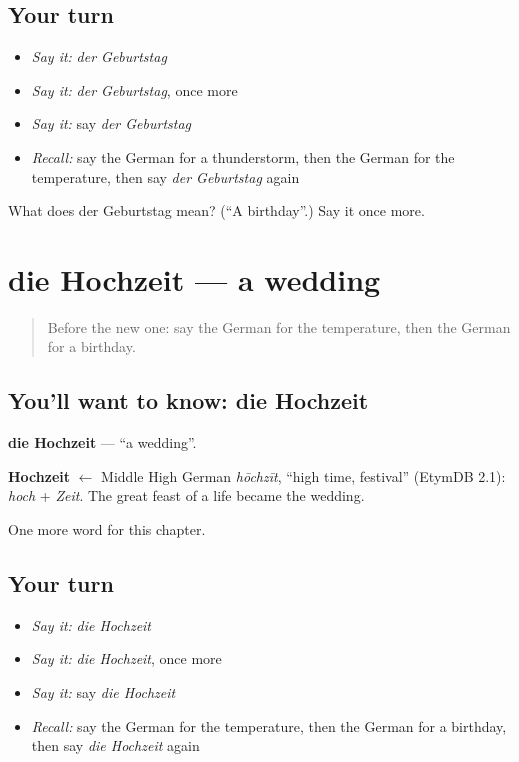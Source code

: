 \subsection*{Your turn}
\begin{itemize}
\raggedright
  \item \emph{Say it:} \emph{der Geburtstag}
  \item \emph{Say it:} \emph{der Geburtstag}, once more
  \item \emph{Say it:} say \emph{der Geburtstag}
  \item \emph{Recall:} say the German for a thunderstorm, then the German for the temperature, then say \emph{der Geburtstag} again
\end{itemize}

\begin{tcolorbox}[breakable,colback=teal!4,colframe=teal!35!black,title={Before you move on}]
What does der Geburtstag mean? (\textquotedblleft{}A birthday\textquotedblright{}.) Say it once more.
\end{tcolorbox}
\section[die Hochzeit]{die Hochzeit — a wedding}

\label{lesson:GE-C163-hochzeit}



\begin{quote}
Before the new one: say the German for the temperature, then the German for a birthday.
\end{quote}

\subsection*{You'll want to know: die Hochzeit}
\textbf{die Hochzeit} — \textquotedblleft{}a wedding\textquotedblright{}.

\begin{cousinweb}
\textbf{Hochzeit} $\leftarrow$ Middle High German \emph{hōchzīt}, \textquotedblleft{}high time, festival\textquotedblright{} (EtymDB 2.1): \emph{hoch} + \emph{Zeit}. The great feast of a life became the wedding.
\end{cousinweb}

\begin{grammarlens}[title={What you've built}]
One more word for this chapter.
\end{grammarlens}

\subsection*{Your turn}
\begin{itemize}
\raggedright
  \item \emph{Say it:} \emph{die Hochzeit}
  \item \emph{Say it:} \emph{die Hochzeit}, once more
  \item \emph{Say it:} say \emph{die Hochzeit}
  \item \emph{Recall:} say the German for the temperature, then the German for a birthday, then say \emph{die Hochzeit} again
\end{itemize}

